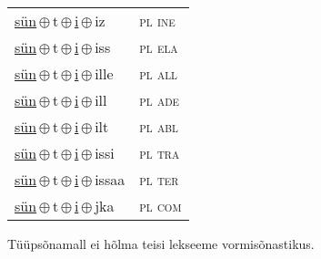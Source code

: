 \begin{minipage}{\textwidth}
\begin{sideways}
\begin{tabular}{l l}
\underline{sün}\,$\oplus$\,t\,$\oplus$\,\underline{i}\,$\oplus$\,iz & \textsc{ pl ine } \\
\underline{sün}\,$\oplus$\,t\,$\oplus$\,\underline{i}\,$\oplus$\,iss & \textsc{ pl ela } \\
\underline{sün}\,$\oplus$\,t\,$\oplus$\,\underline{i}\,$\oplus$\,ille & \textsc{ pl all } \\
\underline{sün}\,$\oplus$\,t\,$\oplus$\,\underline{i}\,$\oplus$\,ill & \textsc{ pl ade } \\
\underline{sün}\,$\oplus$\,t\,$\oplus$\,\underline{i}\,$\oplus$\,ilt & \textsc{ pl abl } \\
\underline{sün}\,$\oplus$\,t\,$\oplus$\,\underline{i}\,$\oplus$\,issi & \textsc{ pl tra } \\
\underline{sün}\,$\oplus$\,t\,$\oplus$\,\underline{i}\,$\oplus$\,issaa & \textsc{ pl ter } \\
\underline{sün}\,$\oplus$\,t\,$\oplus$\,\underline{i}\,$\oplus$\,jka & \textsc{ pl com } \\
\end{tabular}
\end{sideways}
\label{tab:tüüpsõnamall-sünti}

\end{minipage}

 
\vspace{1em}
\noindent Tüüpsõnamall  ei hõlma teisi lekseeme vormi\-sõnastikus.
